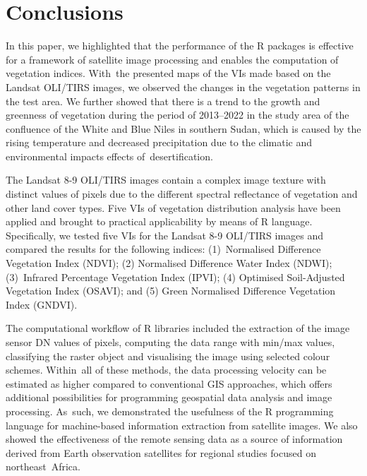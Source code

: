 \documentclass[jimaging,article,accept,pdftex,moreauthors]{Definitions/mdpi}
\begin{document}
\section{Conclusions}\label{sect5}

In this paper, we highlighted that the performance of the R packages is effective for a framework of satellite image processing and enables the computation of vegetation indices. With~the presented maps of the VIs made based on the Landsat OLI/TIRS images, we observed the changes in the vegetation patterns in the test area. We further showed that there is a trend to the growth and greenness of vegetation during the period of 2013--2022 in the study area of the confluence of the White and Blue Niles in southern Sudan, which is caused by the rising temperature and decreased precipitation due to the climatic and environmental impacts effects of~desertification.

The Landsat 8-9 OLI/TIRS images contain a complex image texture with distinct values of pixels due to the different spectral reflectance of vegetation and other land cover types. Five VIs of vegetation distribution analysis have been applied and brought to practical applicability by means of R language. Specifically, we tested five VIs for the Landsat 8-9 OLI/TIRS images and compared the results for the following indices: \mbox{(1) Normalised} Difference Vegetation Index (NDVI); (2) Normalised Difference Water Index (NDWI); (3)~Infrared Percentage Vegetation Index (IPVI); (4) Optimised Soil-Adjusted Vegetation Index (OSAVI); and (5) Green Normalised Difference Vegetation Index (GNDVI). 

The computational workflow of R libraries included the extraction of the image sensor DN values of pixels, computing the data range with min/max values, classifying the raster object and visualising the image using selected colour schemes. Within~all of these methods, the data processing velocity can be estimated as higher compared to conventional GIS approaches, which offers additional possibilities for programming geospatial data analysis and image processing. As~such, we demonstrated the usefulness of the R programming language for machine-based information extraction from satellite images. We also showed the effectiveness of the remote sensing data as a source of information derived from Earth observation satellites for regional studies focused on northeast~Africa.
\end{document}

